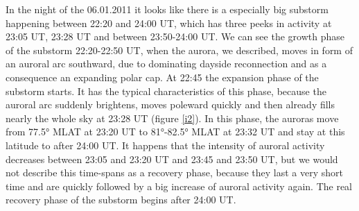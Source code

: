 \documentclass[10pt,a4paper]{article}
\begin{document}
 In the night of the 06.01.2011 it looks like there is a especially big substorm happening between 22:20 and 24:00 UT, which has three peeks in activity at 23:05 UT, 23:28 UT and between 23:50-24:00 UT.
We can see the growth phase of the substorm 22:20-22:50 UT, when the aurora, we described, moves in form of an auroral arc southward, due to dominating dayside reconnection and as a consequence an expanding polar cap. At 22:45 the expansion phase of the substorm starts. It has the typical characteristics of this phase, because the auroral arc suddenly brightens, moves poleward quickly and then already fills nearly the whole sky at 23:28 UT (figure \ref{i2}). In this phase, the auroras move from 77.5° MLAT at 23:20 UT to 81°-82.5° MLAT at 23:32 UT and stay at this latitude to after 24:00 UT. It happens that the intensity of auroral activity decreases between 23:05 and 23:20 UT and 23:45 and 23:50 UT, but we would not describe this time-spans as a recovery phase, because they last a very short time and are quickly followed by a big increase of auroral activity again. The real recovery phase of the substorm begins after 24:00 UT.   
\end{document}
